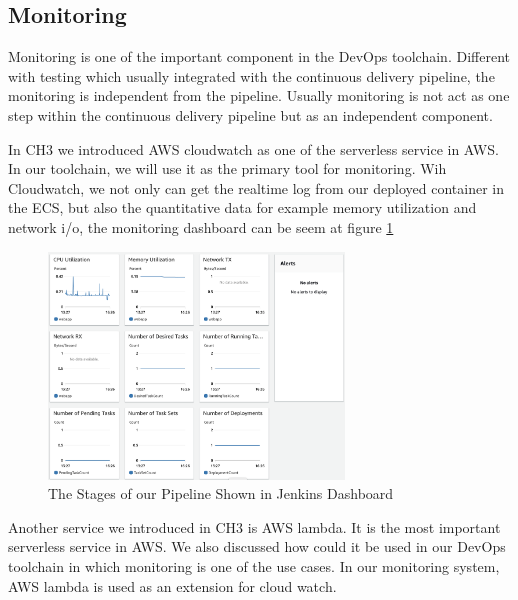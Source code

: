 \subsection{Monitoring}
Monitoring is one of the important component in the DevOps toolchain. Different with testing which usually integrated with the continuous delivery pipeline, the monitoring is independent from the pipeline. Usually monitoring is not act as one step within the continuous delivery pipeline but as an independent component.
\par
In CH3 we introduced AWS cloudwatch as one of the serverless service in AWS. In our toolchain, we will use it as the primary tool for monitoring. Wih Cloudwatch, we not only can get the realtime log from our deployed container in the ECS, but also the quantitative data for example memory utilization and network i/o, the monitoring dashboard can be seem at figure \ref{fig:monitoring}
\begin{figure}[h]
    \centering
    \includegraphics[width=0.70\textwidth]{pics/monitoring.png}
    \caption{The Stages of our Pipeline Shown in Jenkins Dashboard}
    \label{fig:monitoring}
\end{figure}
Another service we introduced in CH3 is AWS lambda. It is the most important serverless service in AWS. We also discussed how could it be used in our DevOps toolchain in which monitoring is one of the use cases. In our monitoring system, AWS lambda is used as an extension for cloud watch. 

